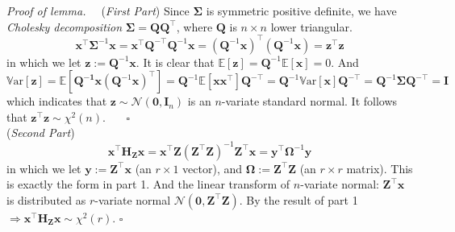 \documentclass[a4paper, 11pt]{article}
\begin{document}
\begin{itemize}
	\textit{Proof of lemma.~~} (\emph{First Part}) Since $\bm{\Sigma}$ is symmetric positive definite, we have \emph{Cholesky decomposition} $\bm{\Sigma} = \bm{Q}\bm{Q}^{\top}$, where $\bm{Q}$ is $n\times n$ lower triangular.
	$$
	\bm{x}^{\top} \bm{\Sigma}^{-1}\bm{x} = \bm{x}^{\top} \bm{Q}^{-\top}\bm{Q}^{-1}\bm{x} = (\bm{Q}^{-1}\bm{x})^{\top}(\bm{Q}^{-1}\bm{x}) = \bm{z}^{\top} \bm{z}
	$$
	in which we let $\bm{z}:=\bm{Q}^{-1}\bm{x}$. It is clear that $\mathbb{E}\left[\bm{z}\right] = \bm{Q}^{-1} \mathbb{E}\left[\bm{x}\right] = 0$. And 
	$$
	\mathrm{\mathbb{V}ar}\left[\bm{z}\right] = \mathbb{E}\left[\bm{\bm{Q}^{-1}\bm{x}}(\bm{Q}^{-1}\bm{x})^{\top}\right] = \bm{Q}^{-1} \mathbb{E}[\bm{x}\bm{x}^{\top}] \bm{Q}^{-\top} = \bm{Q}^{-1} \mathrm{\mathbb{V}ar}\left[\bm{x}\right] \bm{Q}^{-\top} = \bm{Q}^{-1} \bm{\Sigma} \bm{Q}^{-\top} = \bm{I}
	$$
	which indicates that $\bm{z}\sim \mathcal{N}(\bm{0}, \bm{I}_n)$ is an $n$-variate standard normal. It follows that $\bm{z}^{\top} \bm{z}\sim \chi^2(n)$. ~~~$\square$ \\
	(\emph{Second Part}) 
	$$
	\bm{x}^{\top} \bm{H}_{\bm{Z}}\bm{x} = \bm{x}^{\top} \bm{Z}(\bm{Z}^{\top} \bm{Z})^{-1}\bm{Z}^{\top}\bm{x} = \bm{y}^{\top} \bm{\Omega}^{-1}\bm{y}
	$$
	in which we let $\bm{y}:=\bm{Z}^{\top} \bm{x}$ (an $r\times 1$ vector), and $\bm{\Omega}:=\bm{Z}^{\top} \bm{Z}$ (an $r\times r$ matrix). This is exactly the form in part 1. And the linear transform of $n$-variate normal: $\bm{Z}^{\top} \bm{x}$ is distributed as $r$-variate normal $\mathcal{N}(\bm{0}, \bm{Z}^{\top} \bm{Z})$. By the result of part 1 $\Rightarrow \bm{x}^{\top} \bm{H}_{\bm{Z}}\bm{x} \sim \chi^2(r)$. $\square$



\end{itemize}
\end{document}
